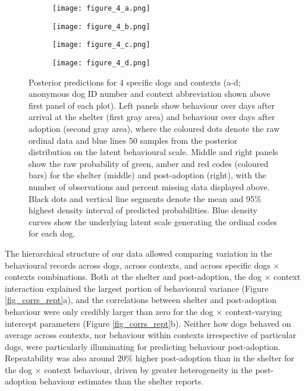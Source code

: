 \documentclass[12pt]{article}
\begin{document}
\begin{figure}[t!]
  \centering
  \begin{subfigure}{1\textwidth}
    \centering
    \texttt{[image: figure\_4\_a.png]}
  \end{subfigure}
  \begin{subfigure}{1\textwidth}
    \centering
    \vspace{-0.6cm}
    \texttt{[image: figure\_4\_b.png]}
  \end{subfigure}
  \begin{subfigure}{1\textwidth}
    \centering
    \vspace{-0.6cm}
    \texttt{[image: figure\_4\_c.png]}
  \end{subfigure}
  \begin{subfigure}{1\textwidth}
    \centering
    \vspace{-0.6cm}
    \texttt{[image: figure\_4\_d.png]}
  \end{subfigure}%
  \caption{\footnotesize{
  Posterior predictions for 4 specific dogs and contexts (a-d; anonymous dog ID number and context abbreviation shown above first panel of each plot). Left panels show behaviour over days after arrival at the shelter (first gray area) and behaviour over days after adoption (second gray area), where the coloured dots denote the raw ordinal data and blue lines 50 samples from the posterior distribution on the latent behavioural scale. Middle and right panels show the raw probability of green, amber and red codes (coloured bars) for the shelter (middle) and post-adoption (right), with the number of observations and percent missing data displayed above. Black dots and vertical line segments denote the mean and 95\% highest density interval of predicted probabilities. Blue density curves show the underlying latent scale generating the ordinal codes for each dog.}
  }
  \label{fig_pps}
\end{figure}

The hierarchical structure of our data allowed comparing variation in the behavioural records across dogs, across contexts, and across specific dogs $\times$ contexts combinations. Both at the shelter and post-adoption, the dog $\times$ context interaction explained the largest portion of behavioural variance (Figure \ref{fig_corrs_rept}a), and the correlations between shelter and post-adoption behaviour were only credibly larger than zero for the dog $\times$ context-varying intercept parameters (Figure \ref{fig_corrs_rept}b). Neither how dogs behaved on average across contexts, nor behaviour within contexts irrespective of particular dogs, were particularly illuminating for predicting behaviour post-adoption. Repeatability was also around 20\% higher post-adoption than in the shelter for the dog $\times$ context behaviour, driven by greater heterogeneity in the post-adoption behaviour estimates than the shelter reports.
\end{document}
